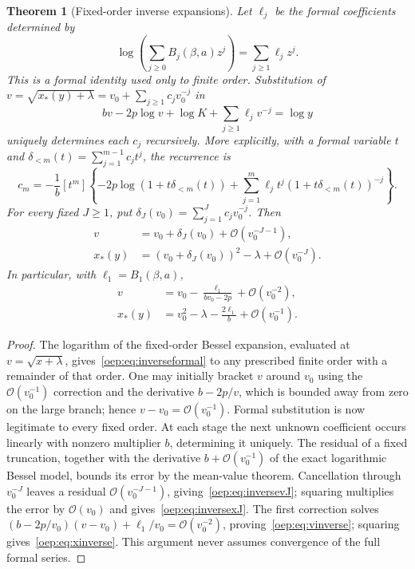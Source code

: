 \documentclass[11pt,letterpaper]{article}
\newtheorem{theorem}{Theorem}[section]
\theoremstyle{remark}\newtheorem{remark}[theorem]{Remark}
\newcommand{\OO}{\mathcal O}
\begin{document}
\begin{theorem}[Fixed-order inverse expansions]\label{oep:thm:inverse}
Let $\ell_j$ be the formal coefficients determined by
\begin{equation}\label{oep:eq:logseries}
 \log\!\left(\sum_{j\geq0}B_j(\beta,a)z^j\right)
       =\sum_{j\geq1}\ell_jz^j.
\end{equation}
This is a formal identity used only to finite order. Substitution of
$v=\sqrt{x_*(y)+\lambda}=v_0+\sum_{j\geq1}c_jv_0^{-j}$ in
\begin{equation}\label{oep:eq:inverseformal}
 bv-2p\log v+\log K+\sum_{j\geq1}\ell_jv^{-j}=\log y
\end{equation}
uniquely determines each $c_j$ recursively. More explicitly, with a formal variable $t$ and
$\delta_{<m}(t)=\sum_{j=1}^{m-1}c_jt^j$, the recurrence is
\begin{equation}\label{oep:eq:inverserecurrence}
 c_m=-\frac1b[t^m]\left\{-2p\log(1+t\delta_{<m}(t))
 +\sum_{j=1}^{m}\ell_jt^j(1+t\delta_{<m}(t))^{-j}\right\}.
\end{equation}
For every fixed $J\geq1$, put $\delta_J(v_0)=\sum_{j=1}^{J}c_jv_0^{-j}$. Then
\begin{align}
 v&=v_0+\delta_J(v_0)+\OO(v_0^{-J-1}),\label{oep:eq:inversevJ}\\
 x_*(y)&=(v_0+\delta_J(v_0))^2-\lambda+\OO(v_0^{-J}).\label{oep:eq:inversexJ}
\end{align}
In particular, with $\ell_1=B_1(\beta,a)$,
\begin{align}
 v&=v_0-\frac{\ell_1}{bv_0-2p}+\OO(v_0^{-2}),\label{oep:eq:vinverse}\\
 x_*(y)&=v_0^2-\lambda-\frac{2\ell_1}{b}+\OO(v_0^{-1}).\label{oep:eq:xinverse}
\end{align}
\end{theorem}
\begin{proof}
The logarithm of the fixed-order Bessel expansion, evaluated at $v=\sqrt{x+\lambda}$, gives~\eqref{oep:eq:inverseformal} to any prescribed finite order with a remainder of that order. One may initially bracket $v$ around $v_0$ using the $\OO(v_0^{-1})$ correction and the derivative $b-2p/v$, which is bounded away from zero on the large branch; hence $v-v_0=\OO(v_0^{-1})$. Formal substitution is now legitimate to every fixed order. At each stage the next unknown coefficient occurs linearly with nonzero multiplier $b$, determining it uniquely. The residual of a fixed truncation, together with the derivative $b+\OO(v_0^{-1})$ of the exact logarithmic Bessel model, bounds its error by the mean-value theorem. Cancellation through $v_0^{-J}$ leaves a residual $\OO(v_0^{-J-1})$, giving~\eqref{oep:eq:inversevJ}; squaring multiplies the error by $\OO(v_0)$ and gives~\eqref{oep:eq:inversexJ}. The first correction solves $(b-2p/v_0)(v-v_0)+\ell_1/v_0=\OO(v_0^{-2})$, proving~\eqref{oep:eq:vinverse}; squaring gives~\eqref{oep:eq:xinverse}. This argument never assumes convergence of the full formal series.
\end{proof}
\end{document}
